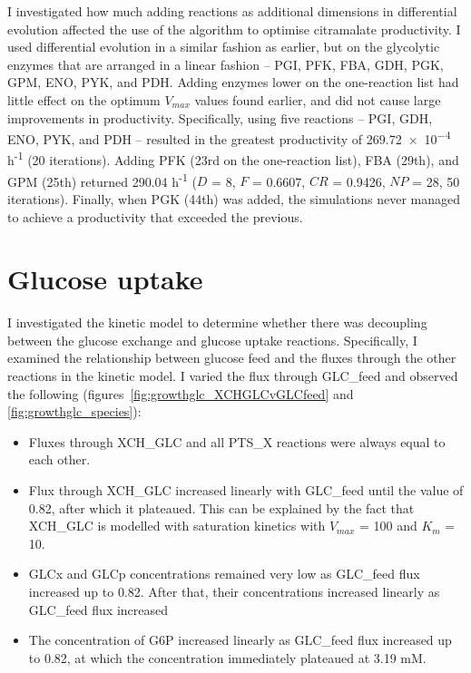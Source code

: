 \documentclass[parskip=full, numbers=noenddot]{scrreprt}
\begin{document}
I investigated how much adding reactions as additional dimensions in differential evolution affected the use of the algorithm to optimise citramalate productivity. I used differential evolution in a similar fashion as earlier, but on the glycolytic enzymes that are arranged in a linear fashion --  PGI, PFK, FBA, GDH, PGK, GPM, ENO, PYK, and PDH. Adding enzymes lower on the one-reaction list had little effect on the optimum $V_{max}$ values found earlier, and did not cause large improvements in productivity.
Specifically, using five reactions -- PGI, GDH, ENO, PYK, and PDH -- resulted in the greatest productivity of \num{269.72e-4} h\textsuperscript{-1} (20 iterations). Adding PFK (23rd on the one-reaction list), FBA (29th), and GPM (25th) returned \num{290.04} h\textsuperscript{-1} ($D$ = 8, $F$ = 0.6607, $CR$ = 0.9426, $NP$ = 28, 50 iterations). Finally, when PGK (44th) was added, the simulations never managed to achieve a productivity that exceeded the previous.

\section{Glucose uptake}
\label{sec:glucoseuptake}


I investigated the kinetic model to determine whether there was decoupling between the glucose exchange and glucose uptake reactions.
Specifically, I examined the relationship between glucose feed and the fluxes through the other reactions in the kinetic model. I varied the flux through GLC\_feed and observed the following (figures~\ref{fig:growthglc_XCHGLCvGLCfeed} and \ref{fig:growthglc_species}):

\begin{itemize}
\item Fluxes through XCH\_GLC and all PTS\_X reactions were always equal to each other.
\item Flux through XCH\_GLC increased linearly with GLC\_feed until the value of 0.82, after which it plateaued. This can be explained by the fact that XCH\_GLC is modelled with saturation kinetics with $V_{max}$ = 100 and $K_{m}$ = 10.
\item GLCx and GLCp concentrations remained very low as GLC\_feed flux increased up to 0.82. After that, their concentrations increased linearly as GLC\_feed flux increased
  \item The concentration of G6P increased linearly as GLC\_feed flux increased up to 0.82, at which the concentration immediately plateaued at 3.19 mM.
\end{itemize}
\end{document}
